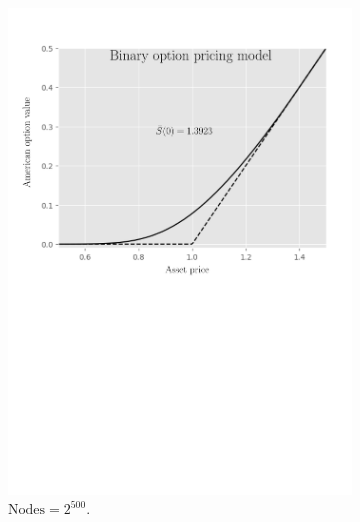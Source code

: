 \begin{figure}[H]
  \centering
  \begin{subfigure}{0.4\textwidth}
    \centering
    \includegraphics[width=\textwidth]{chapters/chapter3/TestCase3BOPM.pdf}
    \caption{$\text{Nodes} = 2^{500}$.}
    \label{fig:finitedifferencesschemes:numericaresults:test_case_3_bopm}
  \end{subfigure}
  \hspace{0.5cm}
  \begin{subfigure}{0.4\textwidth}
    \centering

\end{subfigure}
\end{figure}

